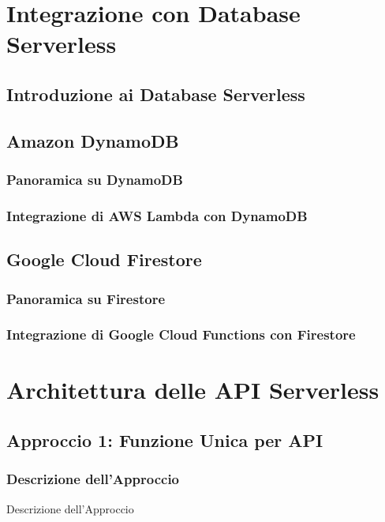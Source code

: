 \documentclass[12pt,a4paper,twoside]{book}
\begin{document}
\chapter{Integrazione con Database Serverless}

\section{Introduzione ai Database Serverless}


\section{Amazon DynamoDB}
\subsection{Panoramica su DynamoDB}


\subsection{Integrazione di AWS Lambda con DynamoDB}


\section{Google Cloud Firestore}
\subsection{Panoramica su Firestore}


\subsection{Integrazione di Google Cloud Functions con Firestore}


\chapter{Architettura delle API Serverless}
\section{Approccio 1: Funzione Unica per API}
\subsection{Descrizione dell’Approccio}
Descrizione dell’Approccio
\end{document}
